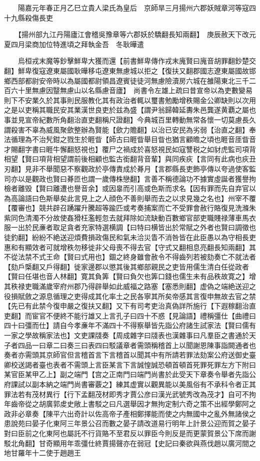 　　陽嘉元年春正月乙巳立貴人梁氏為皇后　京師旱三月揚州六郡妖賊章河等寇四十九縣殺傷長吏

　　【揚州部九江丹陽廬江會稽吳豫章等六郡妖於驕翻長知兩翻】　庚辰赦天下改元夏四月梁商加位特進頃之拜執金吾　冬耿曄遣

　　烏桓戎末魔等鈔擊鮮卑大獲而還【前書鮮卑傳作戎末廆賢曰廆音胡罪翻鈔楚交翻】鮮卑復寇遼東屬國耿曄移屯遼東無慮城以拒之【復扶又翻郡國志遼東屬國故邯鄉西部都尉安帝時以為屬國都尉領昌遼賓徒徒河無慮險瀆房六城在雒陽東北三千二百六十里無慮因毉無慮山以名縣慮音廬】　尚書令左雄上疏曰昔宣帝以為吏數變易則下不安業久於其事則民服教化其有政治者輒以璽書勉勵增秩賜金公卿缺則以次用之是以吏稱其職民安其業漢世良吏於兹為盛【謂尹翁歸韓延夀朱邑龔遂黄覇之屬也事並見宣帝紀數所角翻治直吏翻稱尺證翻】今典城百里轉動無常各懷一切莫慮長久謂殺害不辜為威風聚歛整辦為賢能【歛力贍翻】以治已安民為劣弱【治直之翻】奉法循理為不治髠鉗之戮生於睚眥【師古曰睚眥舉目眥也猶言顧曕之頃也睚音厓眥音才賜翻字書曰睚牛懈翻怒視也】覆尸之禍成於喜怒視民如寇讐税之如豺虎監司項背相望【賢曰項背相望謂前後相顧也監古銜翻背音輩】與同疾疢【言同有此病也疢丑刃翻】見非不舉聞惡不察觀政於亭傳責成於朞月【言郡縣長吏飾亭傳以夸過使客監司亦以是觀政也賢曰朞匝也謂一歲傳株戀翻】言善不稱德論功不據實虛誕者獲譽拘檢者離毁【賢曰離遭也譽音余】或因辠而引高或色斯而求名【因有罪而先自弃官以為高論語曰色斯舉矣此言見上之人顔色不善則舉而去之以求見幾之名也】州宰不覆【覆審也】競共辟召踴躍升騰超等踰匹或考奏捕案而亡不受罪會赦行賂復見洗滌朱紫同色清濁不分故使姦猾枉濫輕忽去就拜除如流缺動百數鄉官部吏職賤禄薄車馬衣服一出於民亷者取足貪者充家特選横調【曰特曰横皆出於常賦之外者也賢曰調徵也徒釣翻】紛紛不絶送迎煩費損政傷民和氣未洽災眚不消咎皆在此臣愚以為守相長吏惠和有顯效者可就增秩勿移徙非父母喪不得去官【守式又翻相息亮翻長知兩翻】其不從法禁不式王命【賢曰式用也】錮之終身雖會赦令不得齒列若被劾奏亡不就法者【劾戶㮣翻又戶得翻】徙家邊郡以懲其後其鄉部親民之吏皆用儒生清白任從政者【賢曰任堪也音人林翻】寛其負筭【賢曰負欠也筭口錢也儒生未有品秩故寛之】增其秩禄吏職滿歲宰府州郡乃得辟舉如此威福之路塞【塞悉則翻】虚偽之端絶送迎之役損賦斂之源息循理之吏得成其化率土之民各寧其所矣帝感其言復申無故去官之禁【先已有此禁今復申嚴之復扶又翻】又下有司考吏治真偽詳所施行【下遐稼翻治直吏翻】而宦官不便終不能行雄又上言孔子曰四十不惑【見論語】禮稱彊仕【曲禮曰四十曰彊而仕】請自今孝亷年不滿四十不得察舉皆先詣公府諸生試家法【賢曰儒有一家之學故稱家法也】文吏課牋奏【周成雜字曰牋表也漢雜事曰凡羣臣之書通於天子者四品一曰章二曰奏三曰表四曰駁議章者需頭稱稽首上以聞謝恩陳事詣闕通者也奏者亦需頭其京師官但言稽首言下言稽首以聞其中有所請若罪法劾案公府送御史臺卿校送謁者臺也表者不需頭上言臣某言下言誠惶誠恐頓首頓首死罪死罪左方下附曰某官臣某甲乙上】副之端門【宫之正南門曰端門尚書於此受天下章奏令舉者先詣公府課試以副本納之端門尚書審覈之】練其虚實以觀異能以美風俗有不承科令者正其罪法若有茂材異行【行下孟翻茂材即秀才賈公彦曰漢光武號秀改為茂才】自可不拘年齒帝從之胡廣郭䖍史敞上書駁之曰凡選舉因才無拘定制六奇之策不出經學鄭阿之政非必章奏【陳平六出奇計以佐高帝子產相鄭擇能而使之内無國中之亂外無諸侯之患說苑曰晏子化東阿三年景公召而數之晏子請改道易行明年上計景公迎而賀之晏子對曰臣前之化東阿也屬託不行貨賂不至君反以罪臣今則反是而更蒙賀景公下席而謝駁北角翻】甘奇顯用年乖彊仕終賈揚聲亦在弱冠【史記曰秦欲與燕伐趙以廣河間之地甘羅年十二使于趙趙王